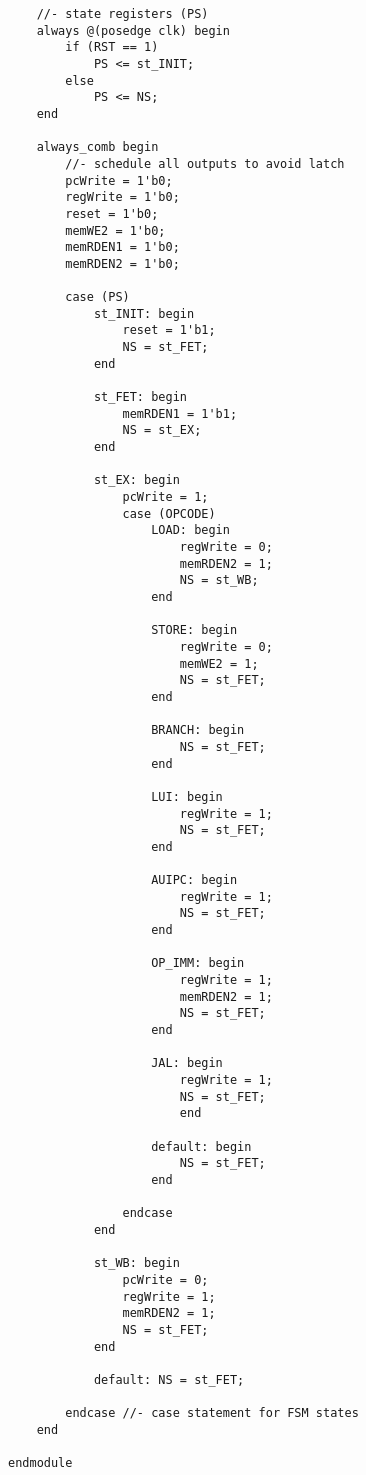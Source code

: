 \documentclass{article}
\begin{document}
\begin{verbatim}
    //- state registers (PS)
    always @(posedge clk) begin
        if (RST == 1)
            PS <= st_INIT;
        else
            PS <= NS;
    end
    
    always_comb begin              
        //- schedule all outputs to avoid latch
        pcWrite = 1'b0;    
        regWrite = 1'b0;    
        reset = 1'b0;  
        memWE2 = 1'b0;
        memRDEN1 = 1'b0;    
        memRDEN2 = 1'b0;
                        
        case (PS)
            st_INIT: begin
                reset = 1'b1;                    
                NS = st_FET; 
            end

            st_FET: begin
                memRDEN1 = 1'b1;                    
                NS = st_EX; 
            end
                
            st_EX: begin
                pcWrite = 1;
                case (OPCODE)
                    LOAD: begin
                        regWrite = 0;
                        memRDEN2 = 1;
                        NS = st_WB;
                    end
                    
                    STORE: begin
                        regWrite = 0;
                        memWE2 = 1;
                        NS = st_FET;
                    end
                    
                    BRANCH: begin
                        NS = st_FET;
                    end
                    
                    LUI: begin
                        regWrite = 1;
                        NS = st_FET;
                    end
                    
                    AUIPC: begin
                        regWrite = 1;
                        NS = st_FET;
                    end
                        
                    OP_IMM: begin 
                        regWrite = 1;	
                        memRDEN2 = 1;
                        NS = st_FET;
                    end
                    
                    JAL: begin
                        regWrite = 1; 
                        NS = st_FET;
                        end
                        
                    default: begin 
                        NS = st_FET;
                    end
                    
                endcase
            end
                
            st_WB: begin
                pcWrite = 0;
                regWrite = 1; 
                memRDEN2 = 1;
                NS = st_FET;
            end
    
            default: NS = st_FET;
            
        endcase //- case statement for FSM states
    end
            
endmodule
    
\end{verbatim}
\end{document}

